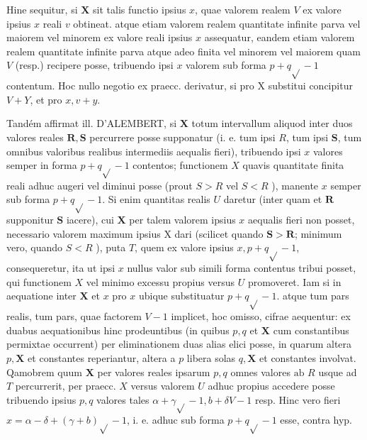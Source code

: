 \documentclass[twoside,12pt, showframe]{memoir}
\begin{document}
Hine sequitur, si \(\boldsymbol{X}\) sit talis functio ipsius \(x\), quae valorem realem \(V\) ex valore ipsius \(x\) reali \(v\) obtineat. atque etiam valorem realem quantitate infinite parva vel maiorem vel minorem ex valore reali ipsius \(x\) assequatur, eandem etiam valorem realem quantitate infinite parva atque adeo finita vel minorem vel maiorem quam \(V\) (resp.) recipere posse, tribuendo ipsi \(x\) valorem sub forma \(p+q \sqrt{ }-1\) contentum. Hoc nullo negotio ex praecc. derivatur, si pro \(\mathrm{X}\) substitui concipitur \(V+Y\), et pro \(x, v+y\).

Tandém affirmat ill. D'ALEMBERT, si \(\boldsymbol{X}\) totum intervallum aliquod inter duos valores reales \(\boldsymbol{R}, \boldsymbol{S}\) percurrere posse supponatur (i. e. tum ipsi \(R\), tum ipsi \(\boldsymbol{S}\), tum omnibus valoribus realibus intermediis aequalis fieri), tribuendo ipsi \(x\) valores semper in forma \(p+q \sqrt{ }-1\) contentos; functionem \(X\) quavis quantitate finita reali adhuc augeri vel diminui posse (prout \(S>R\) vel \(S<R\) ), manente \(x\) semper sub forma \(p+q \sqrt{ }-1\). Si enim quantitas realis \(U\) daretur (inter quam et \(\boldsymbol{R}\) supponitur \(\boldsymbol{S}\) iacere), cui \(\boldsymbol{X}\) per talem valorem ipsius \(x\) aequalis fieri non posset, necessario valorem maximum ipsius \(\mathrm{X}\) dari (scilicet quando \(\boldsymbol{S}>\boldsymbol{R}\); minimum vero, quando \(S<R\) ), puta \(T\), quem ex valore ipsius \(x, p+q \sqrt{ }-1\), consequeretur, ita ut ipsi \(x\) nullus valor sub simili forma contentus tribui posset, qui functionem \(X\) vel minimo excessu propius versus \(U\) promoveret. Iam si in aequatione inter \(\boldsymbol{X}\) et \(x\) pro \(x\) ubique substituatur \(p+q \sqrt{ }-1\). atque tum pars realis, tum pars, quae factorem \(V-1\) implicet, hoc omisso, cifrae aequentur: ex duabus aequationibus hinc prodeuntibus (in quibus \(p, q\) et \(\boldsymbol{X}\) cum constantibus permixtae occurrent) per eliminationem duas alias elici posse, in quarum altera \(p, \boldsymbol{X}\) et constantes reperiantur, altera a \(p\) libera solas \(q, \boldsymbol{X}\) et constantes involvat. Qamobrem quum \(\mathbf{X}\) per valores reales ipsarum \(p, q\) omnes valores \(\mathrm{ab}\) \(R\) usque ad \(T\) percurrerit, per praecc. \(X\) versus valorem \(U\) adhuc propius accedere posse tribuendo ipsius \(p, q\) valores tales \(\alpha+\gamma \sqrt{ }-1, b+\delta V-1\) resp. Hinc vero fieri \(x=\alpha-\delta+(\gamma+b) \sqrt{ }-1\), i. e. adhuc sub forma \(p+q \sqrt{ }-1\) esse, contra hyp.
\end{document}
